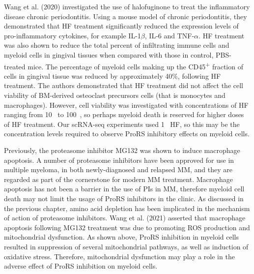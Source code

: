 Wang et al. (2020) investigated the use of halofuginone to treat the inflammatory disease chronic periodontitis\cite{wang2020halofuginone}.
Using a mouse model of chronic periodontitis, they demonstrated that HF treatment significantly reduced the expression levels of pro-inflammatory cytokines, for example IL-1$\beta$, IL-6 and TNF-$\alpha$.
HF treatment was also shown to reduce the total percent of infiltrating immune cells and myeloid cells in gingival tissues when compared with those in control, PBS-treated mice.
The percentage of myeloid cells making up the CD45\textsuperscript{+} fraction of cells in gingival tissue was reduced by approximately 40\%, following HF treatment.
The authors demonstrated that HF treatment did not affect the cell viability of BM-derived osteoclast precursors cells (that is monocytes and macrophages).
However, cell viability was investigated with concentrations of HF ranging from 10\si{\pico\Molar} to 100\si{\nano\Molar}, so perhaps myeloid death is reserved for higher doses of HF treatment.
Our scRNA-seq experiments used 1\si{\micro\Molar} HF, so this may be the concentration levels required to observe ProRS inhibitory effects on myeloid cells.

Previously, the proteasome inhibitor MG132 was shown to induce macrophage apoptosis\cite{wang2021proteasome}.
A number of proteasome inhibitors have been approved for use in multiple myeloma, in both newly-diagnosed and relapsed MM, and they are regarded as part of the cornerstone for modern MM treatment.
Macrophage apoptosis has not been a barrier in the use of PIs in MM, therefore myeloid cell death may not limit the usage of ProRS inhibitors in the clinic.
As discussed in the previous chapter, amino acid depletion has been implicated in the mechanism of action of proteasome inhibitors.
Wang et al. (2021) asserted that macrophage apoptosis following MG132 treatment was due to promoting ROS production and mitochondrial dysfunction\cite{wang2021proteasome}.
As shown above, ProRS inhibition in myeloid cells resulted in suppression of several mitochondrial pathways, as well as induction of oxidative stress.
Therefore, mitochondrial dysfunction may play a role in the adverse effect of ProRS inhibition on myeloid cells.


